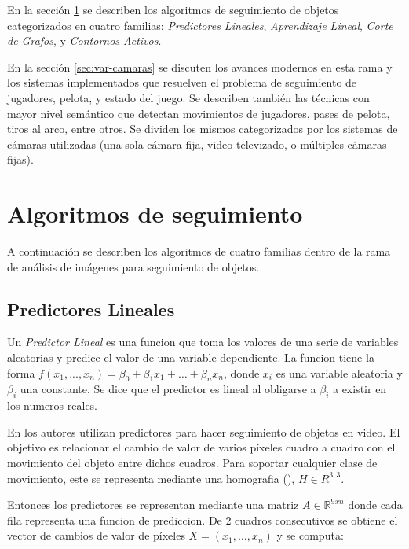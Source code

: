 \documentclass[a4paper,10pt]{article}
\begin{document}
En la sección \ref{sec:tracking} se describen los algoritmos de seguimiento
de objetos categorizados en cuatro familias:
\textit{Predictores Lineales},
\textit{Aprendizaje Lineal},
\textit{Corte de Grafos},
y \textit{Contornos Activos}.

En la sección \ref{sec:var-camaras} se discuten los avances modernos en esta
rama y los sistemas implementados que resuelven el problema de seguimiento de
jugadores, pelota, y estado del juego. Se describen también las técnicas con
mayor nivel semántico que detectan movimientos de jugadores, pases de pelota,
tiros al arco, entre otros. Se dividen los mismos categorizados por los
sistemas de cámaras utilizadas (una sola cámara fija, video televizado, o
múltiples cámaras fijas).

\newpage

\section{Algoritmos de seguimiento}
\label{sec:tracking}

A continuación se describen los algoritmos de cuatro familias dentro de la rama
de análisis de imágenes para seguimiento de objetos.

\subsection{Predictores Lineales}

Un \textit{Predictor Lineal} es una funcion que toma los valores de una serie
de variables aleatorias y predice el valor de una variable dependiente.  La
funcion tiene la forma $f(x_1, ..., x_n) = \beta_0 + \beta_1 x_1 + \dots +
\beta_n x_n$, donde $x_i$ es una variable aleatoria y $\beta_i$ una constante.
Se dice que el predictor es lineal al obligarse a $\beta_i$ a existir en los
numeros reales.

En \cite{alp, original-linear-predictors} los autores utilizan predictores para
hacer seguimiento de objetos en video.  El objetivo es relacionar el cambio de
valor de varios píxeles cuadro a cuadro con el movimiento del objeto entre
dichos cuadros.  Para soportar cualquier clase de movimiento, este se
representa mediante una homografia (\cite{homography-estimation}), $H \in
R^{3,3}$.

Entonces los predictores se representan mediante una matriz $A \in
\mathbb{R}^{9xn}$ donde cada fila representa una funcion de prediccion.  De 2
cuadros consecutivos se obtiene el vector de cambios de valor de píxeles $X =
(x_1, \dots, x_n)$ y se computa:
\end{document}
